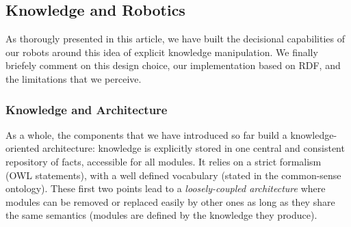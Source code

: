 \documentclass[preprint,3p,times]{elsarticle}
\newcommand{\eg}{{e.g.\xspace}}
\begin{document}
%
%


\subsection{Knowledge and Robotics}
\label{krs-discussion}

As thorougly presented in this article, we have built the decisional
capabilities of our robots around this idea of explicit knowledge manipulation.
We finally briefely comment on this design choice, our implementation based on RDF,
and the limitations that we perceive.

\subsubsection{Knowledge and Architecture}

As a whole, the components that we have introduced so far build a
knowledge-oriented architecture: knowledge is explicitly stored in one central
and consistent repository of facts, accessible for all modules. It relies on a
strict formalism (OWL statements), with a well defined vocabulary
(stated in the common-sense ontology). These first two points lead to a
\emph{loosely-coupled architecture} where modules can be removed or replaced
easily by other ones as long as they share the same semantics (modules are
defined by the knowledge they produce).
\end{document}

